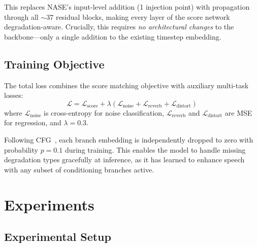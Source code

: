 \documentclass[cameraready]{Interspeech}
\begin{document}
This replaces NASE's input-level addition (1 injection point) with propagation through all ${\sim}37$ residual blocks, making every layer of the score network degradation-aware.
Crucially, this requires \textit{no architectural changes} to the backbone---only a single addition to the existing timestep embedding.


\subsection{Training Objective}

The total loss combines the score matching objective with auxiliary multi-task losses:
\begin{equation}
\mathcal{L} = \mathcal{L}_\text{score} + \lambda \left( \mathcal{L}_\text{noise} + \mathcal{L}_\text{reverb} + \mathcal{L}_\text{distort} \right)
\label{eq:loss}
\end{equation}
where $\mathcal{L}_\text{noise}$ is cross-entropy for noise classification, $\mathcal{L}_\text{reverb}$ and $\mathcal{L}_\text{distort}$ are MSE for regression, and $\lambda = 0.3$.

Following CFG~\cite{ho2022classifier}, each branch embedding is independently dropped to zero with probability $p = 0.1$ during training.
This enables the model to handle missing degradation types gracefully at inference, as it has learned to enhance speech with any subset of conditioning branches active.


\section{Experiments}

\subsection{Experimental Setup}
\end{document}
